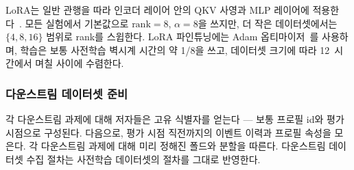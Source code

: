LoRA는 일반 관행을 따라 인코더 레이어 안의 QKV 사영과 MLP 레이어에 적용한다~\citep{hu2022lora,dettmers2023qlora}. 모든 실험에서 기본값으로 $\text{rank}=8$, $\alpha=8$을 쓰지만, 더 작은 데이터셋에서는 $\{4, 8, 16\}$ 범위로 rank를 스윕한다.
LoRA 파인튜닝에는 Adam 옵티마이저~\citep{kingma2015adam}를 사용하며, 학습은 보통 사전학습 벽시계 시간의 약 1/8을 쓰고, 데이터셋 크기에 따라 12~시간에서 며칠 사이에 수렴한다.

\subsubsection{다운스트림 데이터셋 준비}
각 다운스트림 과제에 대해 저자들은 고유 식별자를 얻는다 — 보통 프로필 id와 평가 시점으로 구성된다.
다음으로, 평가 시점 직전까지의 이벤트 이력과 프로필 속성을 모은다.
각 다운스트림 과제에 대해 미리 정해진 폴드와 분할을 따른다.
다운스트림 데이터셋 수집 절차는 사전학습 데이터셋의 절차를 그대로 반영한다.

